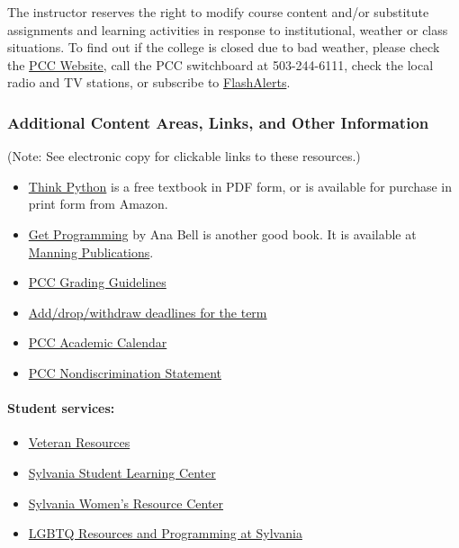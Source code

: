 \documentclass[11pt]{article}
\begin{document}
The instructor reserves the right to modify course content and/or
substitute assignments and learning activities in response to
institutional, weather or class situations. To find out if the college
is closed due to bad weather, please check the
\href{http://www.pcc.edu/}{PCC Website}, call the PCC switchboard at
503-244-6111, check the local radio and TV stations, or subscribe to
\href{https://www.pcc.edu/about/announcements/closure-information.html}{FlashAlerts}.

    \hypertarget{additional-content-areas-links-and-other-information}{%
\subsubsection{Additional Content Areas, Links, and Other
Information}\label{additional-content-areas-links-and-other-information}}

(Note: See electronic copy for clickable links to these resources.)

\begin{itemize}
\item
  \href{http://greenteapress.com/think-python}{Think Python} is a free
  textbook in PDF form, or is available for purchase in print form from
  Amazon.
\item
  \href{https://www.manning.com/books/get-programming}{Get Programming}
  by Ana Bell is another good book. It is available at
  \href{https://www.manning.com/}{Manning Publications}.
\item
  \href{http://www.pcc.edu/resources/academic/standards-practices/AcademicStandardsandPractices-GradingGuidelines.html}{PCC
  Grading Guidelines}
\item
  \href{http://www.pcc.edu/registration/dropping.html}{Add/drop/withdraw
  deadlines for the term}
\item
  \href{http://www.pcc.edu/registration/academic-calendar.html}{PCC
  Academic Calendar}
\item
  \href{https://www.pcc.edu/about/equity-inclusion/eeo-statement.html}{PCC
  Nondiscrimination Statement}
\end{itemize}

\hypertarget{student-services}{%
\paragraph{Student services:}\label{student-services}}

\begin{itemize}
\item
  \href{https://www.pcc.edu/resources/veterans/}{Veteran Resources}
\item
  \href{http://www.pcc.edu/resources/tutoring/sylvania/student-success/}{Sylvania
  Student Learning Center}
\item
  \href{https://www.pcc.edu/resources/women/sylvania/}{Sylvania Women's
  Resource Center}
\item
  \href{https://www.pcc.edu/resources/qrc/sylvania/}{LGBTQ Resources and
  Programming at Sylvania}
\end{itemize}
\end{document}
